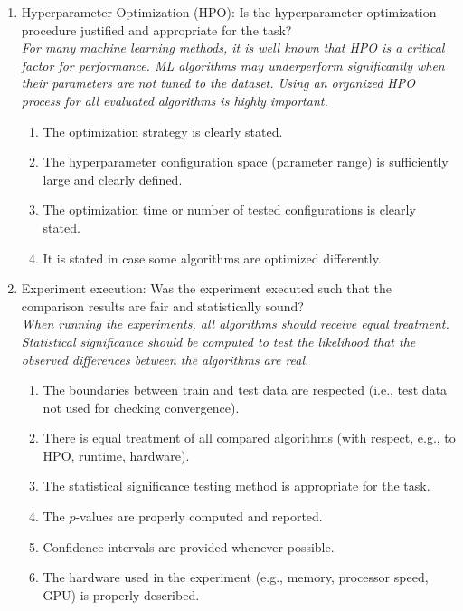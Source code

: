 \begin{enumerate}
    \item Hyperparameter Optimization (HPO): 
    Is the hyperparameter optimization procedure justified and appropriate for the task? \\
    \emph{For many machine learning methods, it is well known that HPO is a critical factor for performance. ML algorithms may underperform significantly when their parameters are not tuned to the dataset. Using an organized HPO process for all evaluated algorithms is highly important.}
    \begin{enumerate} [label*=\arabic*.]
        \item The optimization strategy is clearly stated.
        \item The hyperparameter configuration space (parameter range) is sufficiently large and clearly defined.
        \item The optimization time or number of tested configurations is clearly stated.
        \item It is stated in case some algorithms are optimized differently.
    \end{enumerate}
    
    \item Experiment execution: 
    Was the experiment executed such that the comparison results are fair and statistically sound? \\
    \emph{When running the experiments, all algorithms should receive equal treatment. Statistical significance should be computed to test the likelihood that the observed differences between the algorithms are real.}
    \begin{enumerate} [label*=\arabic*.]
        \item The boundaries between train and test data are respected (i.e., test data not used for checking convergence).
        \item There is equal treatment of all compared algorithms (with respect, e.g., to HPO, runtime, hardware).
        \item The statistical significance testing method is appropriate for the task.
        \item The $p$-values are properly computed and reported.
        \item Confidence intervals are provided whenever possible.
        \item The hardware used in the experiment (e.g., memory, processor speed, GPU) is properly described.
    \end{enumerate}
     

\end{enumerate}
